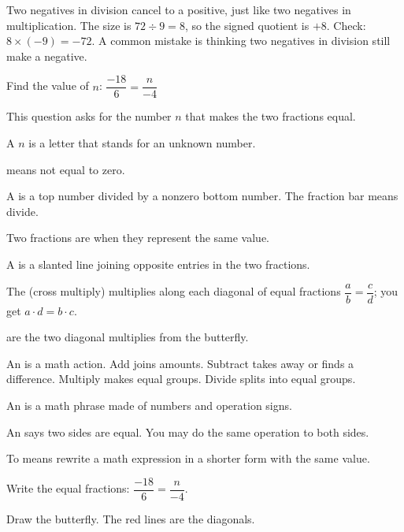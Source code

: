 
\noindent Two negatives in division cancel to a positive, just like two negatives in multiplication. The size is $72 \div 9 = 8$, so the signed quotient is $+8$. Check: $8 \times (-9) = -72$. A common mistake is thinking two negatives in division still make a negative.


\noindent Find the value of $n$: $\dfrac{-18}{6} = \dfrac{n}{-4}$


\noindent This question asks for the number $n$ that makes the two fractions equal.

\begin{words}
  \item A $n$ is a letter that stands for an unknown number.
  \item {}means not equal to zero.
  \item A is a top number divided by a nonzero bottom number. The fraction bar means divide.
  \item Two fractions are when they represent the same value.
  \item A is a slanted line joining opposite entries in the two fractions.
  \item The (cross multiply) multiplies along each diagonal of equal fractions $\dfrac{a}{b} = \dfrac{c}{d}$; you get $a \cdot d = b \cdot c$.
  \item {}are the two diagonal multiplies from the butterfly.
  \item An is a math action. Add joins amounts. Subtract takes away or finds a difference. Multiply makes equal groups. Divide splits into equal groups.
  \item An is a math phrase made of numbers and operation signs.
  \item An says two sides are equal. You may do the same operation to both sides.
  \item To means rewrite a math expression in a shorter form with the same value.
\end{words}

\begin{steps}
  \item Write the equal fractions: $\dfrac{-18}{6} = \dfrac{n}{-4}$.
  \item Draw the butterfly. The red lines are the diagonals.
\end{steps}


